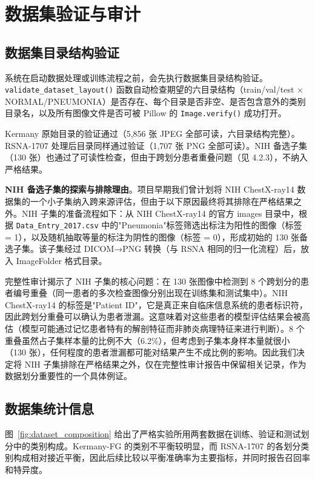 \documentclass[12pt,a4paper,UTF8,openany]{ctexbook}
\begin{document}
\section{数据集验证与审计}

\subsection{数据集目录结构验证}

系统在启动数据处理或训练流程之前，会先执行数据集目录结构验证。\texttt{validate\_dataset\_layout()} 函数自动检查期望的六目录结构（train/val/test × NORMAL/PNEUMONIA）是否存在、每个目录是否非空、是否包含意外的类别目录名，以及所有图像文件是否可被 Pillow 的 \texttt{Image.verify()} 成功打开。

Kermany 原始目录的验证通过（5,856 张 JPEG 全部可读，六目录结构完整）。RSNA-1707 处理后目录同样通过验证（1,707 张 PNG 全部可读）。NIH 备选子集（130 张）也通过了可读性检查，但由于跨划分患者重叠问题（见 4.2.3），不纳入严格结果。

\textbf{NIH 备选子集的探索与排除理由}。项目早期我们曾计划将 NIH ChestX-ray14 数据集的一个小子集纳入跨来源评估，但由于以下原因最终将其排除在严格结果之外。NIH 子集的准备流程如下：从 NIH ChestX-ray14 的官方 images 目录中，根据 \texttt{Data\_Entry\_2017.csv} 中的"Pneumonia"标签筛选出标注为阳性的图像（标签 = 1），以及随机抽取等量的标注为阴性的图像（标签 = 0），形成初始的 130 张备选子集。该子集经过 DICOM→PNG 转换（与 RSNA 相同的归一化流程）后，放入 ImageFolder 格式目录。

完整性审计揭示了 NIH 子集的核心问题：在 130 张图像中检测到 8 个跨划分的患者编号重叠（同一患者的多次检查图像分别出现在训练集和测试集中）。NIH ChestX-ray14 的标签是"Patient ID"，它是真正来自临床信息系统的患者标识符，因此跨划分重叠可以确认为患者泄漏。这意味着对这些患者的模型评估结果会被高估（模型可能通过记忆患者特有的解剖特征而非肺炎病理特征来进行判断）。8 个重叠虽然占子集样本量的比例不大（6.2\%），但考虑到子集本身样本量就很小（130 张），任何程度的患者泄漏都可能对结果产生不成比例的影响。因此我们决定将 NIH 子集排除在严格结果之外，仅在完整性审计报告中保留相关记录，作为数据划分重要性的一个具体例证。

\subsection{数据集统计信息}

图~\ref{fig:dataset_composition} 给出了严格实验所用两套数据在训练、验证和测试划分中的类别构成。Kermany-FG 的类别不平衡较明显，而 RSNA-1707 的各划分类别构成相对接近平衡，因此后续比较以平衡准确率为主要指标，并同时报告召回率和特异度。
\end{document}
